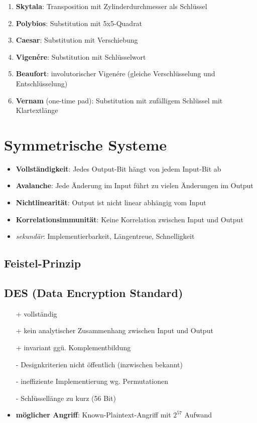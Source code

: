 \documentclass{article}
\begin{document}
\begin{enumerate}
  \item \textbf{Skytala}: Transposition mit Zylinderdurchmesser als Schlüssel
  \item \textbf{Polybios}: Substitution mit 5x5-Quadrat
  \item \textbf{Caesar}: Substitution mit Verschiebung
  \item \textbf{Vigenére}: Substitution mit Schlüsselwort
  \item \textbf{Beaufort}: involutorischer Vigenére (gleiche Verschlüsselung und Entschlüsselung)
  \item \textbf{Vernam} (one-time pad): Substitution mit zufälligem Schlüssel mit Klartextlänge
\end{enumerate}




\section{Symmetrische Systeme}
\begin{itemize}
  \item \textbf{Vollständigkeit}: Jedes Output-Bit hängt von jedem Input-Bit ab
  \item \textbf{Avalanche}: Jede Änderung im Input führt zu vielen Änderungen im Output
  \item \textbf{Nichtlinearität}: Output ist nicht linear abhängig vom Input
  \item \textbf{Korrelationsimmunität}: Keine Korrelation zwischen Input und Output
  \item \textit{sekundär}: Implementierbarkeit, Längentreue, Schnelligkeit
\end{itemize}

\subsection{Feistel-Prinzip}


\subsection{DES (Data Encryption Standard)}
\begin{itemize}
  \item[+] vollständig
  \item[+] kein analytischer Zusammenhang zwischen Input und Output
  \item[+] invariant ggü. Komplementbildung
  \item[-] Designkriterien nicht öffentlich (inzwischen bekannt)
  \item[-] ineffiziente Implementierung wg. Permutationen
  \item[-] Schlüssellänge zu kurz (56 Bit)
  \item \textbf{möglicher Angriff}: Known-Plaintext-Angriff mit $2^{57}$ Aufwand
\end{itemize}
\end{document}
